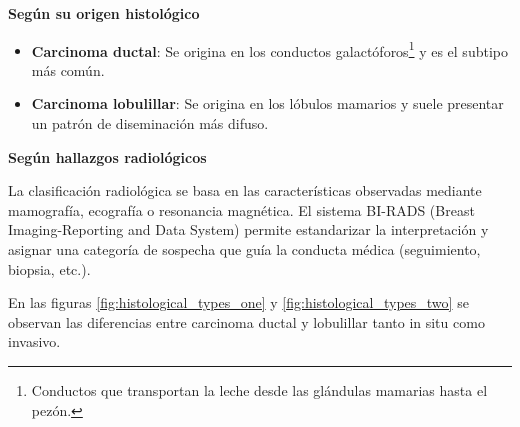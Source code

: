 \documentclass[a4paper,10pt]{book}
\begin{document}
\textbf{Según su origen histológico}
\begin{itemize}

    \item \textbf{Carcinoma ductal}: Se origina en los conductos galactóforos\footnote{Conductos que transportan la leche desde las glándulas mamarias hasta el pezón.} y es el subtipo más común.
    \item \textbf{Carcinoma lobulillar}: Se origina en los lóbulos mamarios y suele presentar un patrón de diseminación más difuso.
\end{itemize}

\textbf{Según hallazgos radiológicos}

La clasificación radiológica se basa en las características observadas mediante mamografía, ecografía o resonancia magnética. El sistema BI-RADS (Breast Imaging-Reporting and Data System) permite estandarizar la interpretación y asignar una categoría de sospecha que guía la conducta médica (seguimiento, biopsia, etc.).

En las figuras \ref{fig:histological_types_one} y \ref{fig:histological_types_two} se observan las diferencias entre carcinoma ductal y lobulillar tanto in situ como invasivo.
\end{document}

